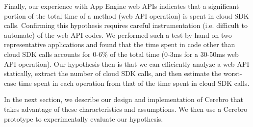 Finally, our experience with App Engine web APIs indicates that a significant
portion of the total time of a method (web API operation) is spent in cloud SDK calls.
Confirming this hypothesis requires careful instrumentation (i.e. difficult
to automate) of the web API codes.  We performed such a test by hand on two 
representative applications and found that the time spent in code other than cloud SDK calls
accounts for $0$-$6$\% of the total time (0-3ms for a 30-50ms web API operation).
Our hypothesis then is that we can efficiently analyze
a web API statically, extract the number of cloud SDK calls,
and then estimate the worst-case time spent in each operation from that of the 
time spent in cloud SDK calls.

In the next section, we describe our design and implementation of Cerebro
that takes advantage of these characteristics and assumptions.
We then use a Cerebro prototype to experimentally evaluate our hypothesis.